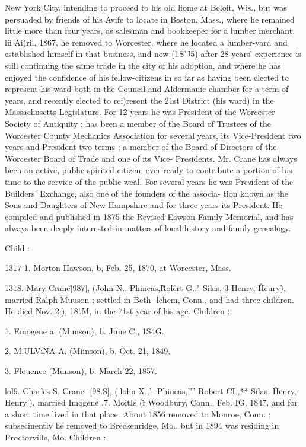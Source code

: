 New York City, intending to proceed to his old liome at Beloit, 
Wis., but was persuaded by friends of his Avife to locate in 
Boston, Mass., where he remained little more than four years, as 
salesman and bookkeeper for a lumber merchant. lii Ai)ril, 
1867, he removed to Worcester, where he located a lumber-yard 
and established himself in that business, and now (l.S'J5) after 
28 years' experience is still continuing the same trade in the city 
of his adoption, and where he has enjoyed the confidence of his 
fellow-citizens in so far as having been elected to represent his 
ward both in the Council and Aldermauic chamber for a term of 
years, and recently elected to rei)resent the 21st District (his 
ward) in the Massachusetts Legislature. For 12 years he was 
President of the Worcester Society of Antiquity ; has been a 
member of the Board of Trustees of the Worcester County 
Mechanics Association for several years, its Vice-President two 
years and President two terms ; a member of the Board of 
Directors of the Worcester Board of Trade and one of its Vice- 
Presidents. Mr. Crane has always been an active, public-spirited 
citizen, ever ready to contribute a portion of his time to the 
service of the public weal. For several years he was President 
of the Builders' Exchange, also one of the founders of the associa- 
tion known as the Sons and Daughters of New Hampshire and 
for three years its President. He compiled and published in 
1875 the Revised Eawson Family Memorial, and has always been 
deeply interested in matters of local history and family genealogy. 

Child : 

1317  1. Morton IIawson, b, Feb. 25, 1870, at Worcester, Mass. 

1318. Mary Crane\^ [987], (John N., Phineas,\^ Rol\^ert G.," 
Silas, 3 Henry, \^ Heury\^), married Ralph Muuson ; settled in Beth- 
lehem, Conn., and had three children. He died Nov. 2;), 18'.M, 
in the 71st year of his age. Children : 

1. Emogene a. (Munson), b. June C,, 1S4G. 

2. M.ULViNA A. (Miinson), b. Oct. 21, 1849. 

3. Flouence (Munson), b. March 22, 1857. 

lol9. Charles S. Crane- [98.S], (.lohu X.,'- Phiiieas,'"' 
Robert CI.,** Silas, \^ Henry,- Henry'), married Imogene .7. MoitIs 
(\^f Woodbury, Conn., Feb. IG, 1847, and for a short time lived in 
that place. About 1856 removed to Monroe, Conn. ; subsecinently 
he removed to Breckenridge, Mo., but in 1894 was residing in 
Proctorville, Mo. Children : 


